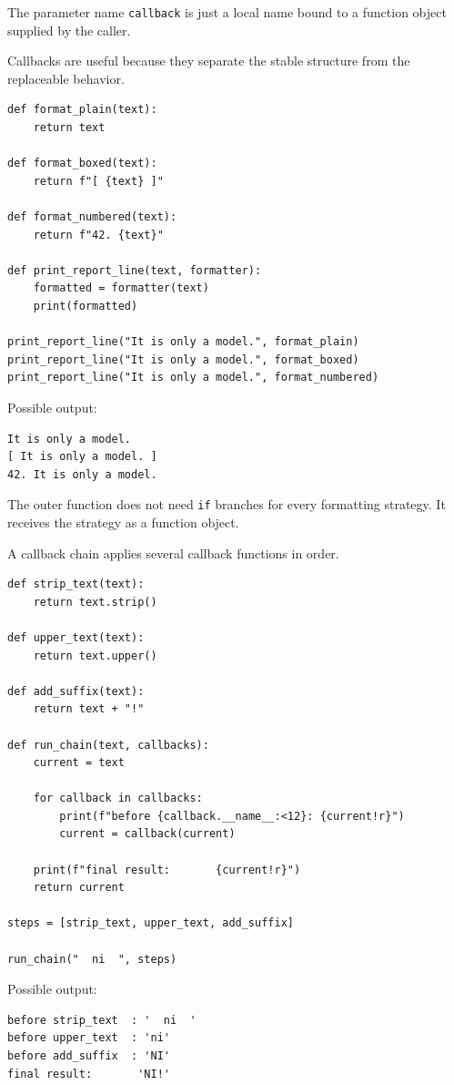 The parameter name \texttt{callback} is just a local name bound to a function object supplied by the caller.

Callbacks are useful because they separate the stable structure from the replaceable behavior.

\begin{verbatim}
def format_plain(text):
    return text

def format_boxed(text):
    return f"[ {text} ]"

def format_numbered(text):
    return f"42. {text}"

def print_report_line(text, formatter):
    formatted = formatter(text)
    print(formatted)

print_report_line("It is only a model.", format_plain)
print_report_line("It is only a model.", format_boxed)
print_report_line("It is only a model.", format_numbered)
\end{verbatim}

Possible output:

\begin{verbatim}
It is only a model.
[ It is only a model. ]
42. It is only a model.
\end{verbatim}

The outer function does not need \texttt{if} branches for every formatting strategy. It receives the strategy as a function object.

A callback chain applies several callback functions in order.

\begin{verbatim}
def strip_text(text):
    return text.strip()

def upper_text(text):
    return text.upper()

def add_suffix(text):
    return text + "!"

def run_chain(text, callbacks):
    current = text

    for callback in callbacks:
        print(f"before {callback.__name__:<12}: {current!r}")
        current = callback(current)

    print(f"final result:       {current!r}")
    return current

steps = [strip_text, upper_text, add_suffix]

run_chain("  ni  ", steps)
\end{verbatim}

Possible output:

\begin{verbatim}
before strip_text  : '  ni  '
before upper_text  : 'ni'
before add_suffix  : 'NI'
final result:       'NI!'
\end{verbatim}

